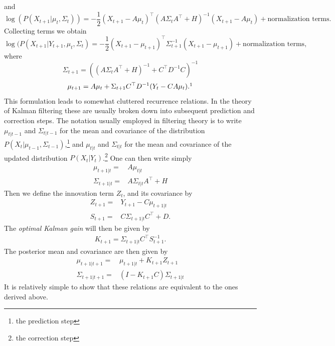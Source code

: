 and
\[
\log( P(X_{t+1}|\mu_t,\Sigma_t))= -\frac{1}{2}(X_{t+1} - A \mu_t)^\top (A\Sigma_tA^\top + H)^{-1} (X_{t+1} - A\mu_t) +\textrm{normalization terms}.
\]
Collecting terms we obtain
\[
\log( P(X_{t+1}|Y_{t+1},\mu_t,\Sigma_t) = -\frac{1}{2}( X_{t+1} - \mu_{t+1})^\top \Sigma_{t+1}^{-1} (X_{t+1}-\mu_{t+1}) + \textrm{normalization terms},
\]
where
\[
\Sigma_{t+1} = \left(\left(A\Sigma_tA^\top+H\right)^{-1} + C^\top D^{-1}C \right)^{-1}
\]
\[
\mu_{t+1} = A\mu_t + \Sigma_{t+1} C^\top D^{-1}  (Y_t -C A\mu_t).\footnotemark
\]
This formulation leads to somewhat cluttered recurrence relations. In the theory of Kalman filtering these are usually broken down into subsequent prediction and correction steps. The notation usually employed in filtering theory is to write $\mu_{t|t-1}$ and $\Sigma_{t|t-1}$ for the mean and covariance of the distribution $P(X_t|\mu_{t-1},\Sigma_{t-1})$,\footnote{the prediction step} and $\mu_{t|t}$ and $\Sigma_{t|t}$ for the mean and covariance of the updated distribution $P(X_t|Y_t)$.\footnote{the correction step} One can then write simply
\begin{eqnarray*}
\mu_{t+1|t} = &A\mu_{t|t}\\
\Sigma_{t+1|t} = & A\Sigma_{t|t}A^\top + H
\end{eqnarray*}
Then we define the innovation term $Z_t$, and its covariance by
\begin{eqnarray*}
Z_{t+1} = & Y_{t+1} - C \mu_{t+1|t}\\
S_{t+1} = & C\Sigma_{t+1|t}C^\top + D.
\end{eqnarray*}
The \emph{optimal Kalman gain} will then be given by
\begin{eqnarray*}
K_{t+1} = \Sigma_{t+1|t} C^\top S_{t+1}^{-1}.
\end{eqnarray*}
The posterior mean and covariance are then given by
\begin{eqnarray*}
\mu_{t+1|t+1} =& \mu_{t+1|t} + K_{t+1} Z_{t+1}\\
\Sigma_{t+1|t+1} =& \left(I-K_{t+1} C\right) \Sigma_{t+1|t}
\end{eqnarray*}
It is relatively simple to show that these relations are equivalent to the ones derived above.\par
